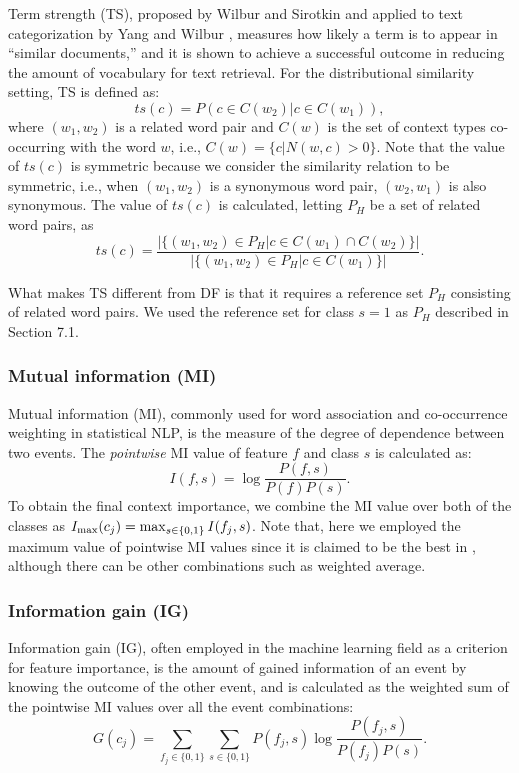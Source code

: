 \documentclass[english]{jnlp_1.4}
\begin{document}
Term strength (TS), proposed by Wilbur and Sirotkin \cite{Wilbur:92}
and applied to text categorization by Yang and Wilbur \cite{Yang:96},
measures how likely a term is to appear in ``similar documents,'' and
it is shown to achieve a successful outcome in reducing the amount of
vocabulary for text retrieval. For the distributional similarity
setting, TS is defined as:
\[
  ts(c) = P(c \in C(w_2) | c \in C(w_1)),
\]
where $(w_1, w_2)$ is a related word pair and $C(w)$ is the set of
context types co-occurring with the word $w$, i.e., $C(w) = \{c|N(w,c)
> 0\}$. Note that the value of $ts(c)$ is symmetric because we consider
the similarity relation to be symmetric, i.e., when $(w_1, w_2)$ is a
synonymous word pair, $(w_2, w_1)$ is also synonymous. The value of
$ts(c)$ is calculated, letting $P_H$ be a set of related word pairs, as
\[
  ts(c) = \frac{|\{(w_1, w_2) \in P_H | c \in C(w_1) \cap
  C(w_2)\}|}{|\{(w_1, w_2) \in P_H | c \in C(w_1)\}|}.
\]

What makes TS different from DF is that it requires a reference set
$P_H$ consisting of related word pairs. We used the reference set for
class $s = 1$ as $P_H$ described in Section 7.1.

\subsubsection{Mutual information (MI)}

Mutual information (MI), commonly used for word association and
co-occurrence weighting in statistical NLP, is the measure of the
degree of dependence between two events. The {\em pointwise} MI value
of feature $f$ and class $s$ is calculated as:
\[
I(f, s) = \log \frac{P(f, s)}{P(f)P(s)}.
\]
To obtain the final context importance, we combine the MI value over
both of the classes as $I_{\rm max}(c_j) = \max_{s \in \{0, 1\}}
I(f_j, s)$. Note that, here we employed the maximum value of pointwise
MI values since it is claimed to be the best in \cite{Yang:97},
although there can be other combinations such as weighted average.

\subsubsection{Information gain (IG)}

Information gain (IG), often employed in the machine learning field as
a criterion for feature importance, is the amount of gained
information of an event by knowing the outcome of the other event, and
is calculated as the weighted sum of the pointwise MI values over all
the event combinations:
\[
G(c_j) = \sum_{f_j \in \{0, 1\}} \sum_{s \in \{0,1\}} P(f_j, s) \log \frac{P(f_j, s)}{P(f_j)P(s)}.
\]
\end{document}
